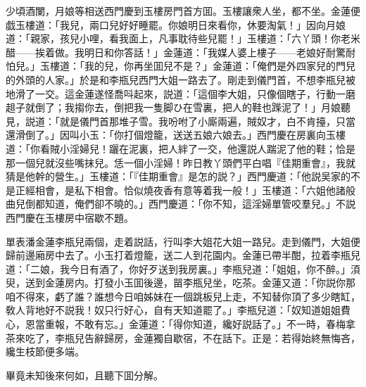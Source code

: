 少頃酒闌，月娘等相送西門慶到玉樓房門首方囬。玉樓讓衆人坐，都不坐。金蓮便戯玉樓道：「我兒，兩口兒好好睡罷。你娘明日來看你，休要淘氣！」因向月娘道：「親家，孩兒小哩，看我面上，凡事耽待些兒罷！」玉樓道：「六丫頭！你老米醋——挨着做。我明日和你答話！」金蓮道：「我媒人婆上樓子——老娘好耐驚耐怕兒。」玉樓道：「我的兒，你再坐囬兒不是？」金蓮道：「俺們是外四家兒的門兒的外頭的人家。」於是和李瓶兒西門大姐一路去了。剛走到儀門首，不想李瓶兒被地滑了一交。這金蓮遂怪喬呌起來，説道：「這個李大姐，只像個瞎子，行動一磨趄子就倒了；我搊你去，倒把我一隻脚ひ在雪裏，把人的鞋也䠕泥了！」月娘聽見，説道：「就是儀門首那堆子雪。我吩咐了小廝兩遍，賊奴才，白不肯擡，只當還滑倒了。」因叫小玉：「你打個燈籠，送送五娘六娘去。」西門慶在房裏向玉樓道：「你看賊小淫婦兒！躧在泥裏，把人絆了一交，他還説人踹泥了他的鞋；恰是那一個兒就沒些嘴抹兒。恁一個小淫婦！昨日教丫頭們平白唱『佳期重會』，我就猜是他幹的營生。」玉樓道：「『佳期重會』是怎的説？」西門慶道：「他説吴家的不是正經相會，是私下相會。恰似燒夜香有意等着我一般！」玉樓道：「六姐他諸般曲兒倒都知道，俺們卻不曉的。」西門慶道：「你不知，這淫婦單管咬羣兒。」不説西門慶在玉樓房中宿歇不題。

單表潘金蓮李瓶兒兩個，走着説話，行叫李大姐花大姐一路兒。走到儀門，大姐便歸前邊廂房中去了。小玉打着燈籠，送二人到花園内。金蓮已帶半酣，拉着李瓶兒道：「二娘，我今日有酒了，你好歹送到我房裏。」李瓶兒道：「姐姐，你不醉。」湏臾，送到金蓮房内。打發小玉囬後邊，㽞李瓶兒坐，吃茶。金蓮又道：「你説你那咱不得來，虧了誰？誰想今日咱姊妹在一個跳板兒上走，不知替你頂了多少瞎缸，敎人背地好不説我！奴只行好心，自有天知道罷了。」李瓶兒道：「奴知道姐姐費心，恩當重報，不敢有忘。」金蓮道：「得你知道，纔好説話了。」不一時，春梅拿茶來吃了，李瓶兒告辭歸房，金蓮獨自歇宿，不在話下。正是：若得始終無悔吝，纔生枝節便多端。

畢竟未知後來何如，且聽下囬分解。

